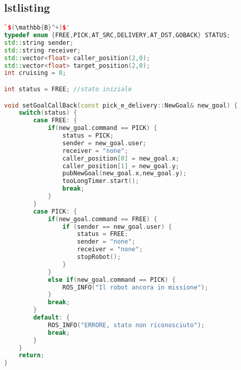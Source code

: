 \subsection{lstlisting}
\begin{lstlisting}[language=C++, caption=Gestione dei comandi da parte di MainNode, label={lst:callback}, escapeinside=`']
`$(\mathbb{B}^+)$'
typedef enum {FREE,PICK,AT_SRC,DELIVERY,AT_DST,GOBACK} STATUS;
std::string sender;
std::string receiver;
std::vector<float> caller_position(2,0);
std::vector<float> target_position(2,0);
int cruising = 0;

int status = FREE; //stato iniziale

void setGoalCallBack(const pick_e_delivery::NewGoal& new_goal) {
    switch(status) {
        case FREE: {
            if(new_goal.command == PICK) {
                status = PICK;
                sender = new_goal.user;
                receiver = "none";
                caller_position[0] = new_goal.x;
                caller_position[1] = new_goal.y;
                pubNewGoal(new_goal.x,new_goal.y);
                tooLongTimer.start();
                break;
            }
        }
        case PICK: {
            if(new_goal.command == FREE) {
                if (sender == new_goal.user) {
                    status = FREE;
                    sender = "none";
                    receiver = "none";
                    stopRobot();
                }
            }
            else if(new_goal.command == PICK) {
                ROS_INFO("Il robot ancora in missione");
            }
            break;
        }
        default: {
            ROS_INFO("ERRORE, stato non riconosciuto");
            break;
        }
    }
    return;
}
\end{lstlisting}
    